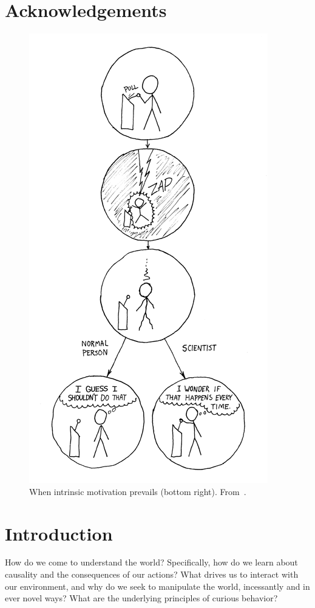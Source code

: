 \documentclass[a4paper]{scrreprt}
\begin{document}
\clearpage
\chapter*{Acknowledgements}
\quad


\newpage


\begin{figure}
\centering
\includegraphics[width=0.5\linewidth]{figs/the_difference.png}
\caption*{When intrinsic motivation prevails (bottom right). From~\cite{xkcd}.}
\end{figure}

\clearpage





\chapter{Introduction}
\label{ch:intro}

How do we come to understand the world? Specifically, how do we learn about causality and the consequences of our actions? What drives us to interact with our environment, and why do we seek to manipulate the world, incessantly and in ever novel ways? What are the underlying principles of curious behavior?
\end{document}
